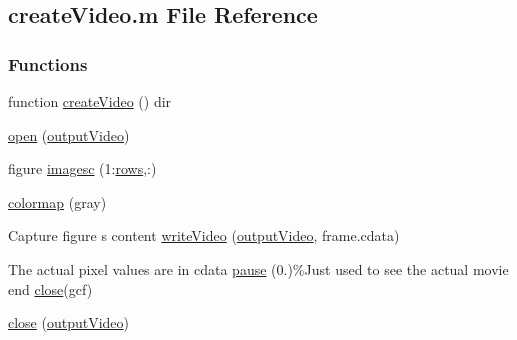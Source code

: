 \hypertarget{a00099}{}\subsection{create\+Video.\+m File Reference}
\label{a00099}
\subsubsection*{Functions}
\begin{DoxyCompactItemize}
\item 
function \hyperlink{a00099_a9db6f438a4447c1ad4956d8fc1924a36}{create\+Video} () dir
\item 
\hyperlink{a00099_ad133c1d4d5c6a212d68ee211b6cdd200}{open} (\hyperlink{a00099_a90c346df14c7ec8c77240e20732f2ac1}{output\+Video})
\item 
figure \hyperlink{a00099_ab0e1a129bba9d8649f7f060184ceaa1e}{imagesc} (1\+:\hyperlink{a00107_a74742cb5c8e2ac354a60cb73383d8176}{rows},\+:)
\item 
\hyperlink{a00099_a797333cf5a0813b58977150b073cb0ea}{colormap} (gray)
\item 
Capture figure s content \hyperlink{a00099_aaf1687c3c0df44c91804f17e3af61452}{write\+Video} (\hyperlink{a00099_a90c346df14c7ec8c77240e20732f2ac1}{output\+Video}, frame.\+cdata)
\item 
The actual pixel values are in cdata \hyperlink{a00099_afd04cafb8eb12e61829c971063bda801}{pause} (0.)\%Just used to see the actual movie end \hyperlink{a00099_a090f64cc5f800295144741c9f4a82bd8}{close}(gcf)
\item 
\hyperlink{a00099_a090f64cc5f800295144741c9f4a82bd8}{close} (\hyperlink{a00099_a90c346df14c7ec8c77240e20732f2ac1}{output\+Video})
\end{DoxyCompactItemize}
